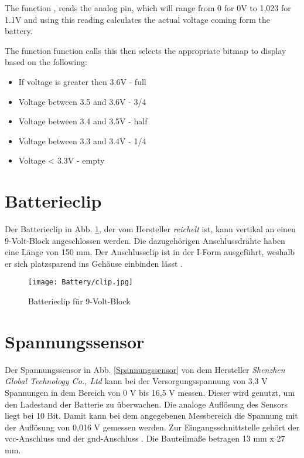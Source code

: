 The function , reads the analog pin, which will range from 0 for 0V to 1,023 for 1.1V and using this reading calculates the actual voltage coming form the battery. 

The function  function calls this then selects the appropriate bitmap to display based on the following: 

\begin{itemize}
    \item If voltage is greater then 3.6V - full 
    \item Voltage between 3.5 and 3.6V - 3/4 
    \item Voltage between 3.4 and 3.5V - half 
    \item Voltage between 3.3 and 3.4V - 1/4 
    \item Voltage < 3.3V - empty 
\end{itemize}



\section{Batterieclip}
Der Batterieclip in Abb. \ref{Batterieclip für 9-Volt-Block}, der vom Hersteller \textit{reichelt} ist, kann vertikal an einen 9-Volt-Block angeschlossen werden. Die dazugehörigen Anschlussdrähte haben eine Länge von 150 mm. Der Anschlussclip ist in der I-Form ausgeführt, weshalb er sich platzsparend ins Gehäuse einbinden lässt \cite{Reichelt:2011}.

\begin{figure}[h]
    \begin{center}
        \texttt{[image: Battery/clip.jpg]}
        \caption{Batterieclip für 9-Volt-Block\cite{Reichelt:2024a}}
        \label{Batterieclip für 9-Volt-Block}
    \end{center}
\end{figure} 

\section{Spannungssensor}
Der Spannungssensor in Abb. \ref{Spannungssensor} von dem Hersteller \textit{Shenzhen Global Technology Co., Ltd} kann bei der Versorgungsspannung von 3,3 V Spannungen in dem Bereich von 0 V bis 16,5 V messen. Dieser wird genutzt, um den Ladestand der Batterie zu überwachen. Die analoge Auflösung des Sensors liegt bei 10 Bit. Damit kann bei dem angegebenen Messbereich die Spannung mit der Auflösung von 0,016 V gemessen werden. Zur Eingangsschnittstelle gehört der \ac{vcc}-Anschluss und der \ac{gnd}-Anschluss \cite{Shenzhen:2015}. Die Bauteilmaße betragen 13 mm x 27 mm.

